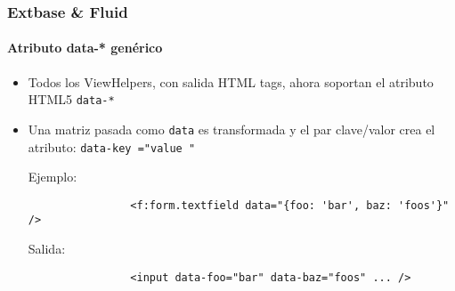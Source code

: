 \begin{frame}[fragile]
	\frametitle{Extbase \& Fluid}
	\framesubtitle{Atributo data-* genérico}


	\begin{itemize}
		\item Todos los ViewHelpers, con salida HTML tags, ahora soportan el atributo HTML5 \texttt{data-*}
		\item Una matriz pasada como \texttt{data} es transformada y el par clave/valor crea el atributo:
			\texttt{data-\begingroup\color{typo3orange}key\endgroup
				="\begingroup\color{typo3orange}value\endgroup
				"}\newline

			Ejemplo:
			\begin{lstlisting}
				<f:form.textfield data="{foo: 'bar', baz: 'foos'}" />
			\end{lstlisting}

			Salida:
			\begin{lstlisting}
				<input data-foo="bar" data-baz="foos" ... />
			\end{lstlisting}
		
	\end{itemize}

\end{frame}


